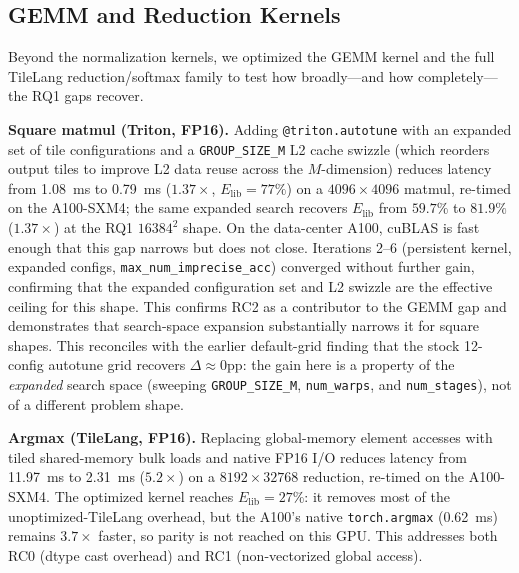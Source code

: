 \subsection{GEMM and Reduction Kernels}
\label{sec:mitig:other}

Beyond the normalization kernels, we optimized the GEMM kernel and the full TileLang
reduction/softmax family to test how broadly---and how completely---the RQ1 gaps recover.

\textbf{Square matmul (Triton, FP16).}
Adding \texttt{@triton.autotune} with an expanded set of tile configurations
and a \texttt{GROUP\_SIZE\_M} L2 cache swizzle (which reorders output tiles to improve L2 data reuse across the $M$-dimension)
reduces latency from 1.08~ms to 0.79~ms ($1.37\times$, $E_\text{lib} = 77\%$)
on a $4096\times4096$ matmul, re-timed on the A100-SXM4;
the same expanded search recovers $E_\text{lib}$ from $59.7\%$ to $81.9\%$ ($1.37\times$) at the RQ1 $16384^2$ shape.
On the data-center A100, cuBLAS is fast enough that this gap narrows but does not close.
Iterations 2--6 (persistent kernel, expanded configs, \texttt{max\_num\_imprecise\_acc}) converged without further gain,
confirming that the expanded configuration set and L2 swizzle are the effective ceiling for this shape.
This confirms RC2 as a contributor to the GEMM gap
and demonstrates that search-space expansion substantially narrows it for square shapes.
This reconciles with the earlier default-grid finding that the stock 12-config autotune grid recovers $\Delta\approx0$pp:
the gain here is a property of the \emph{expanded} search space
(sweeping \texttt{GROUP\_SIZE\_M}, \texttt{num\_warps}, and \texttt{num\_stages}), not of a different problem shape.

\textbf{Argmax (TileLang, FP16).}
Replacing global-memory element accesses with tiled shared-memory bulk loads
and native FP16 I/O reduces latency from 11.97~ms to 2.31~ms ($5.2\times$) on a $8192\times32768$
reduction, re-timed on the A100-SXM4.
The optimized kernel reaches $E_\text{lib} = 27\%$: it removes most of the unoptimized-TileLang overhead,
but the A100's native \texttt{torch.argmax} (0.62~ms) remains $3.7\times$ faster, so parity is not reached on this GPU.
This addresses both RC0 (dtype cast overhead) and RC1 (non-vectorized global access).

